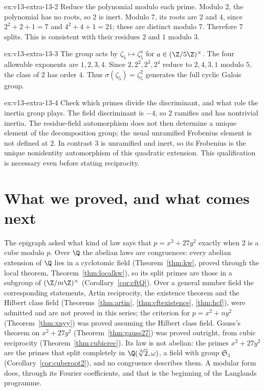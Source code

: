 \begin{solution}{ex:v13-extra-13-2}
\idea Reduce the polynomial modulo each prime.
\writeup Modulo $2$, the polynomial has no roots, so $2$ is inert. Modulo $7$, its roots are $2$ and $4$, since $2^2+2+1=7$ and $4^2+4+1=21$; these are distinct modulo $7$. Therefore $7$ splits. This is consistent with their residues $2$ and $1$ modulo $3$.
\end{solution}

\begin{solution}{ex:v13-extra-13-3}
\idea The group acts by $\zeta_5\mapsto\zeta_5^a$ for $a\in(\Z/5\Z)^\times$.
\writeup The four allowable exponents are $1,2,3,4$. Since $2,2^2,2^3,2^4$ reduce to $2,4,3,1$ modulo $5$, the class of $2$ has order $4$. Thus $\sigma(\zeta_5)=\zeta_5^2$ generates the full cyclic Galois group.
\end{solution}

\begin{solution}{ex:v13-extra-13-4}
\idea Check which primes divide the discriminant, and what role the inertia group plays.
\writeup The field discriminant is $-4$, so $2$ ramifies and has nontrivial inertia. The residue-field automorphism does not then determine a unique element of the decomposition group; the usual unramified Frobenius element is not defined at $2$. In contrast $3$ is unramified and inert, so its Frobenius is the unique nonidentity automorphism of this quadratic extension. This qualification is necessary even before stating reciprocity.
\end{solution}

\section{What we proved, and what comes next}

The epigraph asked what kind of law says that $p=x^2+27y^2$ exactly when $2$ is a cube modulo $p$. Over $\Q$ the abelian laws are
congruences: every abelian extension of $\Q$ lies in a cyclotomic field (Theorem~\ref{thm:kw}, proved through the local theorem,
Theorem~\ref{thm:localkw}), so its split primes are those in a subgroup of $(\Z/m\Z)^\times$ (Corollary~\ref{cor:cftQ}). Over a
general number field the corresponding statements, Artin reciprocity, the existence theorem and the Hilbert class field
(Theorems~\ref{thm:artin}, \ref{thm:cftexistence}, \ref{thm:hcf}), were admitted and are not proved in this series; the criterion
for $p=x^2+ny^2$ (Theorem~\ref{thm:xnyy}) was proved assuming the Hilbert class field. Gauss's theorem on $x^2+27y^2$
(Theorem~\ref{thm:gauss27}) was proved outright, from cubic reciprocity (Theorem~\ref{thm:cubicrec}). Its law is not abelian: the
primes $x^2+27y^2$ are the primes that split completely in $\Q(\sqrt[3]2,\omega)$, a field with group $\mathfrak S_3$
(Corollary~\ref{cor:cuberoot2}), and no congruence describes them. A modular form does, through its Fourier coefficients, and that
is the beginning of the Langlands programme.

